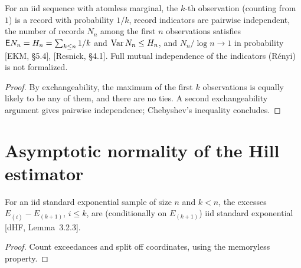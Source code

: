 \begin{theorem}[Records]
  \label{thm:records}
  \leanok
  For an iid sequence with atomless marginal, the $k$-th observation (counting from $1$) is a record
  with probability $1/k$, record indicators are pairwise independent, the number of records
  $N_n$ among the first $n$ observations satisfies $\mathsf{E} N_n = H_n = \sum_{k \le n} 1/k$ and
  $\operatorname{Var} N_n \le H_n$, and $N_n / \log n \to 1$ in probability [EKM, \S5.4], [Resnick, \S4.1].
  Full mutual independence of the indicators (R\'enyi) is not formalized.
\end{theorem}
\begin{proof}
  \leanok
  By exchangeability, the maximum of the first $k$ observations is equally likely to be any of
  them, and there are no ties. A second exchangeability argument gives pairwise independence;
  Chebyshev's inequality concludes.
\end{proof}

\section{Asymptotic normality of the Hill estimator}

\begin{lemma}
  \label{lem:renyi}
  \leanok
  For an iid standard exponential sample of size $n$ and $k < n$, the excesses
  $E_{(i)} - E_{(k+1)}$, $i \le k$, are (conditionally on $E_{(k+1)}$) iid standard exponential
  [dHF, Lemma~3.2.3].
\end{lemma}
\begin{proof}
  \leanok
  Count exceedances and split off coordinates, using the memoryless property.
\end{proof}

